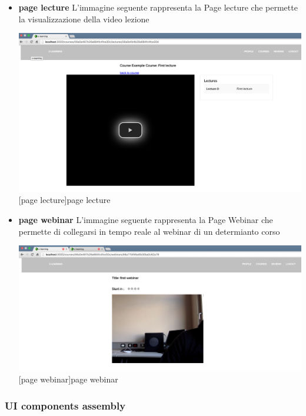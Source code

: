 \begin{itemize}
\item \textbf{page lecture} L'immagine seguente rappresenta la Page lecture che permette la visualizzazione della video lezione\par

\begin{minipage}{\linewidth}
    \centering
    \includegraphics[width=1.0\linewidth]{images/chapter4/page-lecture.png}
    [page lecture]{page lecture}
\end{minipage}


\item \textbf{page webinar} L'immagine seguente rappresenta la Page Webinar che permette di collegarsi in tempo reale al webinar di un determianto corso\par
\begin{minipage}{\linewidth}
    \centering
    \includegraphics[width=1.0\linewidth]{images/chapter4/page-webinar.png}
    [page webinar]{page webinar}
\end{minipage}

\end{itemize}



\subsubsection { UI components assembly}
\label{subsec:4th_step_UI_components_assembly}

